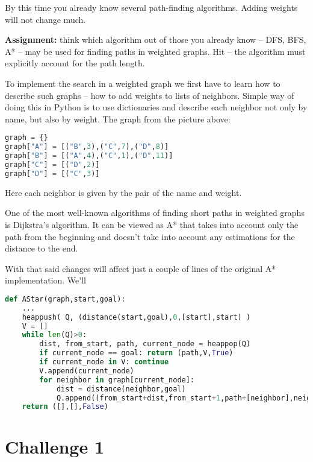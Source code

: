 By this time you already know several path-finding algorithms. 
Adding weights will not change much.

\begin{tcolorbox}
\textbf{Assignment:} think which algorithm out of those you already
know -- DFS, BFS, A* -- may be used for finding paths in weighted graphs.
Hit -- the algorithm must explicitly account for the path length.
\end{tcolorbox}

To implement the search in a weighted graph we first have to learn
how to describe such graphs -- how to add weights to lists of
neighbors. Simple way of doing this in Python is to use dictionaries
and describe each neighbor not only by name, but also by weight. The graph
from the picture above:

\begin{lstlisting}[language=Python,style=codelst2,caption={Python: weighted graphs}]
graph = {}
graph["A"] = [("B",3),("C",7),("D",8)]
graph["B"] = [("A",4),("C",1),("D",11)]
graph["C"] = [("D",2)]
graph["D"] = [("C",3)]
\end{lstlisting}
Here each neighbor is given by the pair of the name and weight.

One of the most well-known algorithms of finding short paths in
weighted graphs is Dijkstra's algorithm. It can be viewed as A*
that takes into account only the path from the beginning and
doesn't take into account any estimations for the distance to the end.

With that said changes will affect just a couple of lines of
the original A* implementation. We'll

\begin{lstlisting}[language=Python,style=codelst2,caption={Python: A* search}]
def AStar(graph,start,goal):
    ...
    heappush( Q, (distance(start,goal),0,[start],start) )
    V = []
    while len(Q)>0:
        dist, from_start, path, current_node = heappop(Q)
        if current_node == goal: return (path,V,True)
        if current_node in V: continue
        V.append(current_node)
        for neighbor in graph[current_node]:
            dist = distance(neighbor,goal)
            Q.append((from_start+dist,from_start+1,path+[neighbor],neighbor))
    return ([],[],False)
\end{lstlisting}



\section{Challenge 1} 

